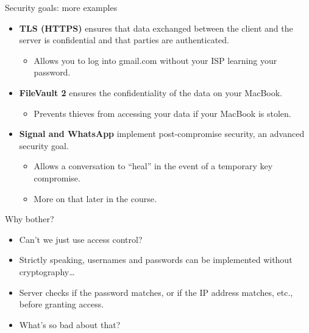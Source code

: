 \ifdefined\PRESENTATION\else\PassOptionsToClass{handout}{beamer}\fi\documentclass[aspectratio=169, lualatex]{beamer}
\begin{document}
\begin{frame}{Security goals: more examples}
	\begin{itemize}[<+->]
		\item \textbf{TLS (HTTPS)} ensures that data exchanged between the client
		      and the server is confidential and that parties are authenticated.
		      \begin{itemize}
			      \item Allows you to log into gmail.com without your ISP learning your password.
		      \end{itemize}
		\item \textbf{FileVault 2} ensures the confidentiality of the data on your
		      MacBook.
		      \begin{itemize}
			      \item Prevents thieves from accessing your data if your MacBook is stolen.
		      \end{itemize}
		\item \textbf{Signal and WhatsApp} implement post-compromise security, an advanced security
		      goal.
		      \begin{itemize}
			      \item Allows a conversation to ``heal'' in the event of a temporary key
			            compromise.
			      \item More on that later in the course.
		      \end{itemize}
	\end{itemize}
\end{frame}

\begin{frame}{Why bother?}
	\begin{itemize}[<+->]
		\item Can't we just use access control?
		\item Strictly speaking, usernames and passwords can be implemented
		      without cryptography\ldots
		\item Server checks if the password matches, or if the IP address matches,
		      etc., before granting access.
		\item What's so bad about that?
	\end{itemize}
\end{frame}
\end{document}
